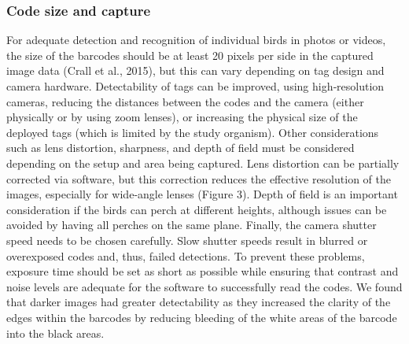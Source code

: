 \documentclass[11pt,a4paper,oneside]{book}
\begin{document}
\subsubsection{Code size and capture}
For adequate detection and recognition of individual birds in photos or videos, the size of the barcodes should be at least 20 pixels per side in the captured image data (Crall et al., 2015), but this can vary depending on tag design and camera hardware. Detectability of tags can be improved, using high‐resolution cameras, reducing the distances between the codes and the camera (either physically or by using zoom lenses), or increasing the physical size of the deployed tags (which is limited by the study organism). Other considerations such as lens distortion, sharpness, and depth of field must be considered depending on the setup and area being captured. Lens distortion can be partially corrected via software, but this correction reduces the effective resolution of the images, especially for wide‐angle lenses (Figure 3). Depth of field is an important consideration if the birds can perch at different heights, although issues can be avoided by having all perches on the same plane. Finally, the camera shutter speed needs to be chosen carefully. Slow shutter speeds result in blurred or overexposed codes and, thus, failed detections. To prevent these problems, exposure time should be set as short as possible while ensuring that contrast and noise levels are adequate for the software to successfully read the codes. We found that darker images had greater detectability as they increased the clarity of the edges within the barcodes by reducing bleeding of the white areas of the barcode into the black areas.
\end{document}

